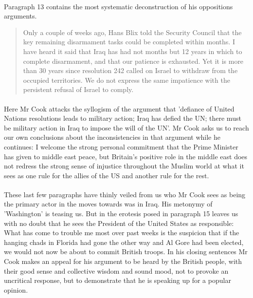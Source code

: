 \documentclass{article}
\begin{document}
\begin{onehalfspace}
\paragraph{}Paragraph 13 contains the most systematic deconstruction of his oppositions arguments. 

\begin{quote}
Only a couple of weeks ago, Hans Blix told the Security Council that the key remaining disarmament tasks could be completed within months. I have heard it said that Iraq has had not months but 12 years in which to complete disarmament, and that our patience is exhausted. Yet it is more than 30 years since resolution 242 called on Israel to withdraw from the occupied territories. We do not express the same impatience with the persistent refusal of Israel to comply.
\end{quote}

\paragraph{}Here Mr Cook attacks the syllogism of the argument that 'defiance of United Nations resolutions leads to military action; Iraq has defied the UN; there must be military action in Iraq to impose the will of the UN'. Mr Cook asks us to reach our own conclusions about the 
inconsistencies in that argument while he continues: I welcome the strong personal commitment that the Prime Minister has given to middle east peace, but Britain's positive role in the middle east does not redress the strong sense of injustice throughout the Muslim world at what it sees as one rule for the allies of the US and another rule for the rest. 

\paragraph{}These last few paragraphs have thinly veiled from us who Mr Cook sees as being the primary actor in the moves towards was in Iraq. His metonymy of 'Washington' is teasing us. But in the erotesis posed in paragraph 15 leaves us with no doubt that he sees the President of the United States as responsible: What has come to trouble me most over past weeks is the suspicion that if the hanging chads in Florida had gone the other way and Al Gore had been elected, we would not now be about to commit British troops. In his closing sentences Mr Cook makes an appeal for his argument to be heard by the British people, with their good sense and collective wisdom and sound mood, not to 
provoke an uncritical response, but to demonstrate that he is speaking up for a popular opinion. 


\end{onehalfspace}
\end{document}
